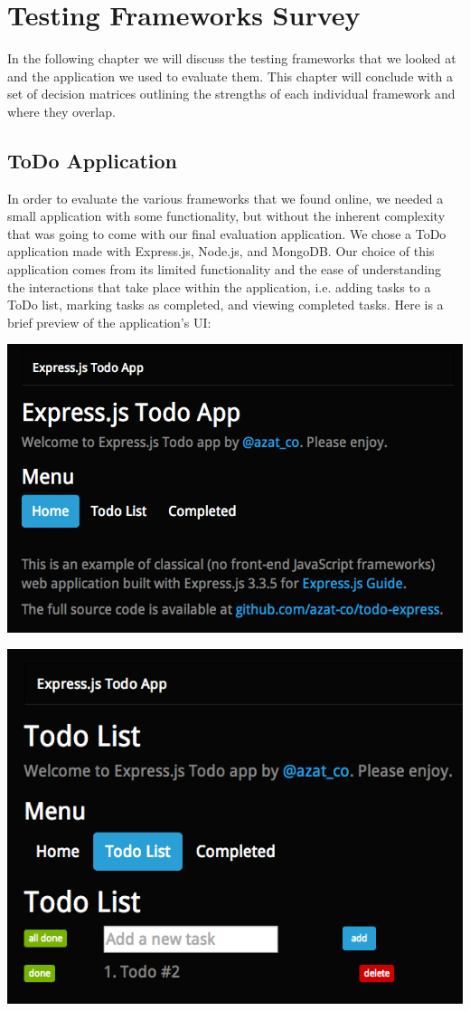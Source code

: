 \documentclass[12pt]{ucthesis}
\newenvironment{Figure}
  {\par\medskip\noindent\minipage{\linewidth}}
  {\endminipage\par\medskip}
\begin{document}
\chapter{Testing Frameworks Survey}
In the following chapter we will discuss the testing frameworks that we looked at and the application we used to evaluate them. This chapter will conclude with a set of decision matrices outlining the strengths of each individual framework and where they overlap.

\section{ToDo Application}
In order to evaluate the various frameworks that we found online, we needed a small application with some functionality, but without the inherent complexity that was going to come with our final evaluation application. We chose a ToDo application made with Express.js, Node.js, and MongoDB\cite{ToDoAppHomePage}. Our choice of this application comes from its limited functionality and the ease of understanding the interactions that take place within the application, i.e. adding tasks to a ToDo list, marking tasks as completed, and viewing completed tasks. Here is a brief preview of the application's UI:

\begin{Figure}
  \centering
  \includegraphics[width=0.75\linewidth]{todo_home.png} 
\end{Figure}

\begin{Figure}
  \centering
  \includegraphics[width=0.75\linewidth]{todo_some_tasks.png}  
\end{Figure}
\end{document}
